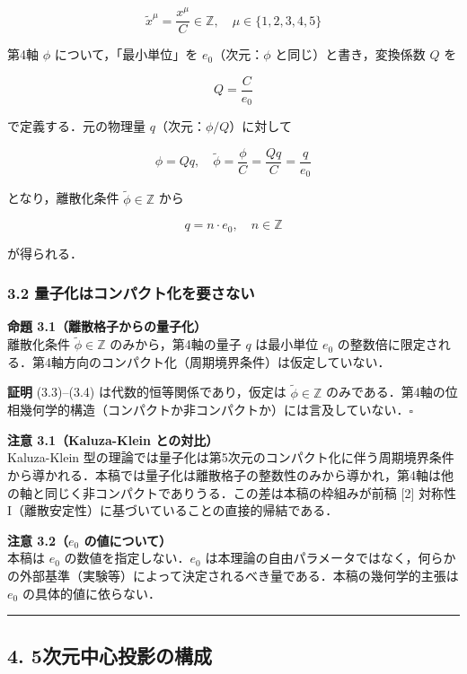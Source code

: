 \documentclass[a4paper,11pt]{ltjsarticle}
\theoremstyle{definition}
\begin{document}
\[\tilde{x}^\mu = \frac{x^\mu}{C} \in \mathbb{Z}, \quad \mu \in \{1,2,3,4,5\} \tag{3.1}\]

第4軸 \(\phi\) について，「最小単位」を \(e_0\)（次元：\(\phi\) と同じ）と書き，変換係数 \(Q\) を

\[Q = \frac{C}{e_0} \tag{3.2}\]

で定義する．元の物理量 \(q\)（次元：\(\phi/Q\)）に対して

\[\phi = Qq, \quad \tilde{\phi} = \frac{\phi}{C} = \frac{Qq}{C} = \frac{q}{e_0} \tag{3.3}\]

となり，離散化条件 \(\tilde{\phi} \in \mathbb{Z}\) から

\[q = n \cdot e_0, \quad n \in \mathbb{Z} \tag{3.4}\]

が得られる．

\subsubsection{3.2 量子化はコンパクト化を要さない}\label{ux91cfux5b50ux5316ux306fux30b3ux30f3ux30d1ux30afux30c8ux5316ux3092ux8981ux3055ux306aux3044}

\textbf{命題 3.1（離散格子からの量子化）}\\
離散化条件 \(\tilde{\phi} \in \mathbb{Z}\) のみから，第4軸の量子 \(q\) は最小単位 \(e_0\) の整数倍に限定される．第4軸方向のコンパクト化（周期境界条件）は仮定していない．

\textbf{証明} (3.3)--(3.4) は代数的恒等関係であり，仮定は \(\tilde{\phi} \in \mathbb{Z}\) のみである．第4軸の位相幾何学的構造（コンパクトか非コンパクトか）には言及していない．\(\square\)

\textbf{注意 3.1（Kaluza-Klein との対比）}\\
Kaluza-Klein 型の理論では量子化は第5次元のコンパクト化に伴う周期境界条件から導かれる．本稿では量子化は離散格子の整数性のみから導かれ，第4軸は他の軸と同じく非コンパクトでありうる．この差は本稿の枠組みが前稿 {[}2{]} 対称性 I（離散安定性）に基づいていることの直接的帰結である．

\textbf{注意 3.2（\(e_0\) の値について）}\\
本稿は \(e_0\) の数値を指定しない．\(e_0\) は本理論の自由パラメータではなく，何らかの外部基準（実験等）によって決定されるべき量である．本稿の幾何学的主張は \(e_0\) の具体的値に依らない．

\begin{center}\rule{0.5\linewidth}{0.5pt}\end{center}

\subsection{4. 5次元中心投影の構成}\label{ux6b21ux5143ux4e2dux5fc3ux6295ux5f71ux306eux69cbux6210}
\end{document}
